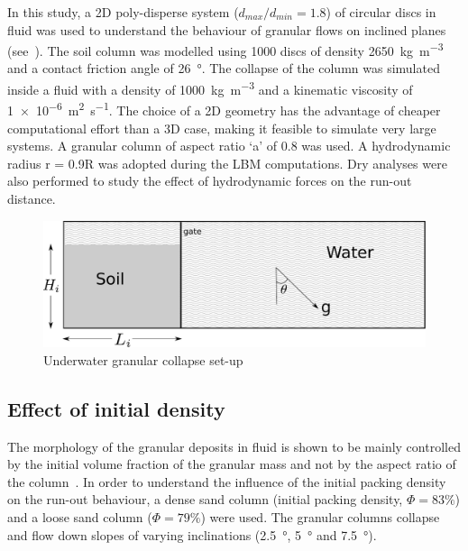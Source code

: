 In this study, a 2D poly-disperse system ($d_{max}/d_{min} = 1.8$) of circular 
discs in fluid was used to understand the behaviour of granular flows on 
inclined planes (see~). The soil column was modelled using 1000 
discs of density \SI{2650}{\kg\per\cubic\meter} and a contact friction angle of 
\SI{26}{\degree}. The collapse of the column was simulated inside a fluid with 
a density of \SI{1000}{\kg\per\cubic\meter}  and a kinematic viscosity of 
\SI{1e-6}{\square\meter\per\second}. The choice of a 2D geometry has the 
advantage of cheaper computational effort than a 3D case, making it feasible to 
simulate very large systems. A granular column of aspect ratio `a' of 0.8 was 
used. A hydrodynamic radius r = 0.9R was adopted during the LBM computations. 
Dry analyses were also performed to study the effect of hydrodynamic forces on 
the run-out distance.

\begin{figure}[htpb]
\includegraphics[width=0.97\columnwidth]{geometry}
\caption{Underwater granular collapse set-up}
\label{fig:setup}
\end{figure}

\subsection{Effect of initial density}
The morphology of the granular deposits in fluid is shown to be mainly controlled by the initial volume fraction of the granular mass and not by the aspect ratio of the column~\citep{Rondon2011,Pailha2008}. In order to understand the influence of the initial packing density on the run-out behaviour, a dense sand column (initial packing density, $\Phi=83\%$) and a loose sand column ($\Phi=79\%$) were used. The granular columns collapse and flow down slopes of varying inclinations (\SI{2.5}{\degree}, \SI{5}{\degree} and \SI{7.5}{\degree}).

